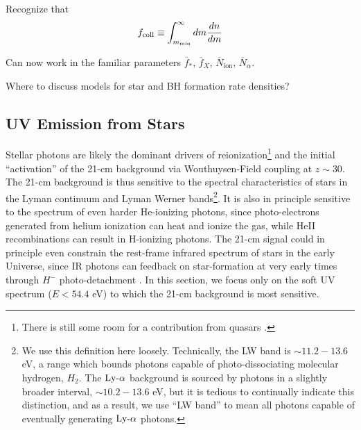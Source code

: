 Recognize that
\begin{equation}
	f_{\text{coll}} \equiv \int_{m_{\text{min}}}^{\infty} dm \frac{dn}{dm}
\end{equation}

Can now work in the familiar parameters $\overline{f}_{\ast}$, $\overline{f}_X$, $\overline{N}_{\mathrm{ion}}$, $\overline{N}_{\alpha}$.
	

{\color{red} Where to discuss models for star and BH formation rate densities?}




%
%


\subsection{UV Emission from Stars}
Stellar photons are likely the dominant drivers of reionization\footnote{There is still some room for a contribution from quasars \cite[see, e.g.,][]{Madau2018}.} and the initial ``activation'' of the 21-cm background via Wouthuysen-Field coupling at $z \sim 30$. The 21-cm background is thus sensitive to the spectral characteristics of stars in the Lyman continuum and Lyman Werner bands\footnote{We use this definition here loosely. Technically, the LW band is $\sim 11.2-13.6$ eV, a range which bounds photons capable of photo-dissociating molecular hydrogen, $H_2$. The $\text{Ly-}\alpha$ background is sourced by photons in a slightly broader interval, $\sim 10.2-13.6$ eV, but it is tedious to continually indicate this distinction, and as a result, we use ``LW band'' to mean all photons capable of eventually generating $\text{Ly-}\alpha$ photons.}. It is also in principle sensitive to the spectrum of even harder He-ionizing photons, since photo-electrons generated from helium ionization can heat and ionize the gas, while HeII recombinations can result in H-ionizing photons. The 21-cm signal could in principle even constrain the rest-frame infrared spectrum of stars in the early Universe, since IR photons can feedback on star-formation at very early times through $H^-$ photo-detachment \cite{WolcottGreen2011}. In this section, we focus only on the soft UV spectrum ($E < 54.4$ eV) to which the 21-cm background is most sensitive.

